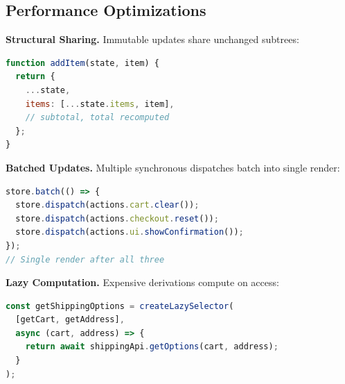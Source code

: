 \subsection{Performance Optimizations}

\textbf{Structural Sharing.} Immutable updates share unchanged subtrees:

\begin{lstlisting}[language=JavaScript,caption=Structural sharing]
function addItem(state, item) {
  return {
    ...state,
    items: [...state.items, item],
    // subtotal, total recomputed
  };
}
\end{lstlisting}

\textbf{Batched Updates.} Multiple synchronous dispatches batch into single render:

\begin{lstlisting}[language=JavaScript,caption=Update batching]
store.batch(() => {
  store.dispatch(actions.cart.clear());
  store.dispatch(actions.checkout.reset());
  store.dispatch(actions.ui.showConfirmation());
});
// Single render after all three
\end{lstlisting}

\textbf{Lazy Computation.} Expensive derivations compute on access:

\begin{lstlisting}[language=JavaScript,caption=Lazy selectors]
const getShippingOptions = createLazySelector(
  [getCart, getAddress],
  async (cart, address) => {
    return await shippingApi.getOptions(cart, address);
  }
);
\end{lstlisting}

